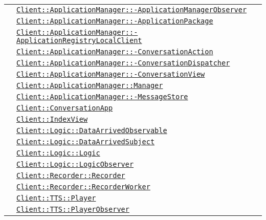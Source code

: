 \begin{longtable}{|>{\centering}m{3cm}|m{10cm}<{\centering}|}
& \hyperref[Client::ApplicationManager::ApplicationManagerObserver]{\texttt{Client::ApplicationManager::-\linebreak ApplicationManagerObserver}}\\
& \hyperref[Client::ApplicationManager::ApplicationPackage]{\texttt{Client::ApplicationManager::-\linebreak ApplicationPackage}}\\
& \hyperref[Client::ApplicationManager::ApplicationRegistryLocalClient]{\texttt{Client::ApplicationManager::-\linebreak ApplicationRegistryLocalClient}}\\
& \hyperref[Client::ApplicationManager::ConversationAction]{\texttt{Client::ApplicationManager::-\linebreak ConversationAction}}\\
& \hyperref[Client::ApplicationManager::ConversationDispatcher]{\texttt{Client::ApplicationManager::-\linebreak ConversationDispatcher}}\\
& \hyperref[Client::ApplicationManager::ConversationView]{\texttt{Client::ApplicationManager::-\linebreak ConversationView}}\\
& \hyperref[Client::ApplicationManager::Manager]{\texttt{Client::ApplicationManager::Manager}}\\
& \hyperref[Client::ApplicationManager::MessageStore]{\texttt{Client::ApplicationManager::-\linebreak MessageStore}}\\
& \hyperref[Client::ConversationApp]{\texttt{Client::ConversationApp}}\\
& \hyperref[Client::IndexView]{\texttt{Client::IndexView}}\\
& \hyperref[Client::Logic::DataArrivedObservable]{\texttt{Client::Logic::DataArrivedObservable}}\\
& \hyperref[Client::Logic::DataArrivedSubject]{\texttt{Client::Logic::DataArrivedSubject}}\\
& \hyperref[Client::Logic::Logic]{\texttt{Client::Logic::Logic}}\\
& \hyperref[Client::Logic::LogicObserver]{\texttt{Client::Logic::LogicObserver}}\\
& \hyperref[Client::Recorder::Recorder]{\texttt{Client::Recorder::Recorder}}\\
& \hyperref[Client::Recorder::RecorderWorker]{\texttt{Client::Recorder::RecorderWorker}}\\
& \hyperref[Client::TTS::Player]{\texttt{Client::TTS::Player}}\\
& \hyperref[Client::TTS::PlayerObserver]{\texttt{Client::TTS::PlayerObserver}}\\ \hline


\end{longtable}
